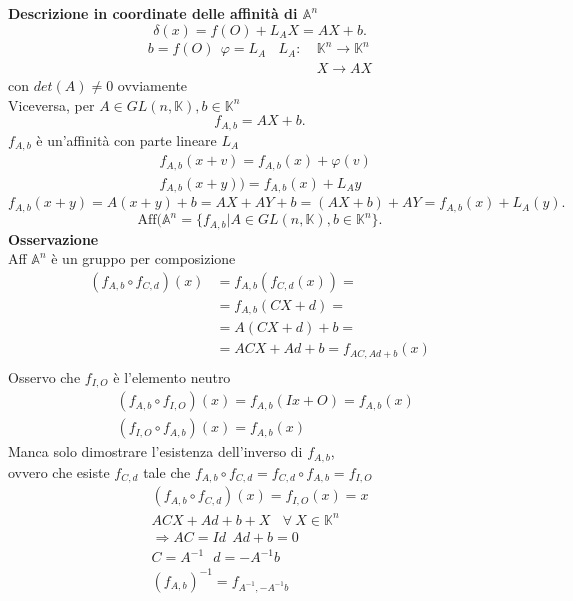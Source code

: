 \documentclass[12px]{article}
\begin{document}
\textbf{Descrizione in coordinate delle affinità di $ \mathbb{A} ^n$} \\
	\[
	\delta (x) = f(O) + L_A X = AX + b
	.\]
	\begin{align*}
		b = f(O) \ \ \varphi = L_A \ \ \ \ L_A : \ &\mathbb{K}^n \rightarrow \mathbb{K}^n \\ 
						    	 & X \rightarrow AX
	\end{align*}
	con $det(A) \neq 0$ ovviamente\\
	Viceversa, per $A\in GL(n,\mathbb{K}), b\in\mathbb{K}^n$\\
	\[
		f_{A,b} = AX + b
	.\] 
	$f_{A,b}$ è un'affinità con parte lineare $L_A$
	\begin{align*}
		& f_{A,b}(x + v) = f_{A,b}(x) + \varphi(v) \\
		& f_{A,b}(x + y)) = f_{A,b}(x) + L_Ay
	\end{align*}
	\[
		f_{A,b}(x + y) = A(x + y) + b = AX + AY + b = (AX + b) + AY = f_{A,b} (x) + L_A(y)
	.\] 
	\[
		\text{Aff}( \mathbb{A}^n =\{f_{A,b} | A\in GL(n,\mathbb{K}), b\in\mathbb{K}^n\}
	.\] 
	\textbf{Osservazione} \\
	Aff $ \mathbb{A} ^n$ è un gruppo per composizione \\ 
	\begin{align*}
		(f_{A,b}\circ f_{C,d})(x)  &= f_{A,b}(f_{C,d}(x)) =\\
					   &= f_{A,b}(CX + d) = \\
					   &=A(CX + d) + b =\\
					   &=ACX + Ad + b = f_{AC, Ad + b}(x) \\
	\end{align*}
	Osservo che $f_{I,O}$ è l'elemento neutro
	\begin{align*}
		&(f_{A,b}\circ f_{I,O})(x) = f_{A,b}(Ix + O) = f_{A,b}(x) \\
		&(f_{I,O}\circ f_{A,b})(x) = f_{A,b}(x)
	\end{align*}
	Manca solo dimostrare l'esistenza dell'inverso di $f_{A,b}$,\\
	ovvero che esiste $f_{C,d}$ tale che $f_{A,b}\circ f_{C,d} = f_{C,d}\circ f_{A,b} = f_{I,O}$
	\begin{align*}
		(f_{A,b}\circ f_{C,d})(x) = f_{I,O}(x) = x \\
		ACX + Ad + b + X \ \ \ \ \forall \  X\in\mathbb{K}^n \\
		\Rightarrow AC = Id \ \ Ad + b = 0\\
		C = A^{-1} \ \ \ d = -A^{-1}b \\
		(f_{A,b})^{-1} = f_{A^{-1}, -A^{-1}b}
	\end{align*}
\end{document}
